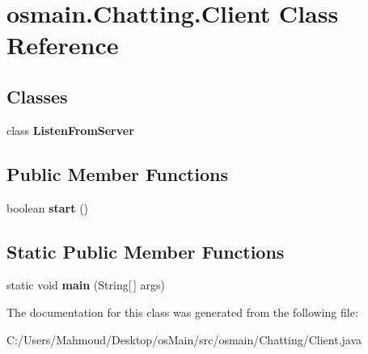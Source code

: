\hypertarget{classosmain_1_1_chatting_1_1_client}{}\section{osmain.\+Chatting.\+Client Class Reference}
\label{classosmain_1_1_chatting_1_1_client}
\subsection*{Classes}
\begin{DoxyCompactItemize}
\item 
class {\bfseries Listen\+From\+Server}
\end{DoxyCompactItemize}
\subsection*{Public Member Functions}
\begin{DoxyCompactItemize}
\item 
boolean {\bfseries start} ()\hypertarget{classosmain_1_1_chatting_1_1_client_a6b4287c68b6f77f8b5f8be9b2d2dcd35}{}\label{classosmain_1_1_chatting_1_1_client_a6b4287c68b6f77f8b5f8be9b2d2dcd35}

\end{DoxyCompactItemize}
\subsection*{Static Public Member Functions}
\begin{DoxyCompactItemize}
\item 
static void {\bfseries main} (String\mbox{[}$\,$\mbox{]} args)\hypertarget{classosmain_1_1_chatting_1_1_client_ae57c3fd1f60e39b52df5ff0cbfad6559}{}\label{classosmain_1_1_chatting_1_1_client_ae57c3fd1f60e39b52df5ff0cbfad6559}

\end{DoxyCompactItemize}


The documentation for this class was generated from the following file\+:\begin{DoxyCompactItemize}
\item 
C\+:/\+Users/\+Mahmoud/\+Desktop/os\+Main/src/osmain/\+Chatting/Client.\+java\end{DoxyCompactItemize}
